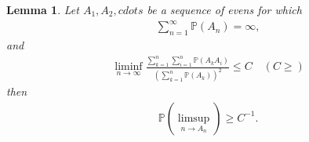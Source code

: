 \documentclass[11pt]{article}
\newtheorem{lemma}[theorem]{Lemma}
\theoremstyle{definition}
\begin{document}
\begin{lemma}
  Let $A_1,A_2,cdots$ be a sequence  of evens for which
\begin{equation*}
  \begin{aligned}
     & \sum^\infty_{n=1} \mathbb{P}(A_n)=\infty, 
  \end{aligned}
\end{equation*}
and 
\begin{equation*}
  \begin{aligned}
     & \liminf_{n\rightarrow\infty}\frac{\sum^n_{k=1}\sum^n_{i=1} \mathbb{P}(A_kA_i)}{\left(\sum^n_{k=1}\mathbb{P}(A_k)\right)^2}\le C\quad(C\ge)
  \end{aligned}
\end{equation*}
then
\begin{equation*}
  \begin{aligned}
     & \mathbb{P}(\limsup_{n\rightarrow A_n})\ge C^{-1}.
  \end{aligned}
\end{equation*}
\end{lemma}
\end{document}
